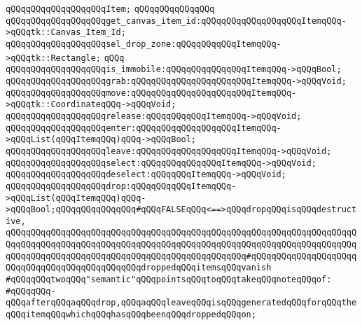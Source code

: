 \verb|qQQqqQQqqQQqqQQqqQQqItem;|\newline
\verb|qQQqqQQqqQQqqQQq|\newline
\verb|qQQqqQQqqQQqqQQqqQQqget_canvas_item_id:qQQqqQQqqQQqqQQqqQQqItemqQQq->qQQqtk::Canvas_Item_Id;|\newline
\newline
\verb|qQQqqQQqqQQqqQQqqQQqsel_drop_zone:qQQqqQQqqQQqItemqQQq->qQQqtk::Rectangle;|\newline
\verb|qQQq|\newline
\verb|qQQqqQQqqQQqqQQqqQQqis_immobile:qQQqqQQqqQQqqQQqItemqQQq->qQQqBool;|\newline
\newline
\verb|qQQqqQQqqQQqqQQqqQQqgrab:qQQqqQQqqQQqqQQqqQQqqQQqItemqQQq->qQQqVoid;|\newline
\verb|qQQqqQQqqQQqqQQqqQQqmove:qQQqqQQqqQQqqQQqqQQqqQQqItemqQQq->qQQqtk::CoordinateqQQq->qQQqVoid;|\newline
\verb|qQQqqQQqqQQqqQQqqQQqrelease:qQQqqQQqqQQqItemqQQq->qQQqVoid;|\newline
\newline
\verb|qQQqqQQqqQQqqQQqqQQqenter:qQQqqQQqqQQqqQQqqQQqItemqQQq->qQQqList(qQQqItemqQQq)qQQq->qQQqBool;|\newline
\verb|qQQqqQQqqQQqqQQqqQQqleave:qQQqqQQqqQQqqQQqqQQqItemqQQq->qQQqVoid;|\newline
\newline
\verb|qQQqqQQqqQQqqQQqqQQqselect:qQQqqQQqqQQqqQQqItemqQQq->qQQqVoid;|\newline
\verb|qQQqqQQqqQQqqQQqqQQqdeselect:qQQqqQQqItemqQQq->qQQqVoid;|\newline
\newline
\verb|qQQqqQQqqQQqqQQqqQQqdrop:qQQqqQQqqQQqItemqQQq->qQQqList(qQQqItemqQQq)qQQq->qQQqBool;qQQqqQQqqQQqqQQq#qQQqFALSEqQQq<==>qQQqdropqQQqisqQQqdestructive,|\newline
\verb|qQQqqQQqqQQqqQQqqQQqqQQqqQQqqQQqqQQqqQQqqQQqqQQqqQQqqQQqqQQqqQQqqQQqqQQqqQQqqQQqqQQqqQQqqQQqqQQqqQQqqQQqqQQqqQQqqQQqqQQqqQQqqQQqqQQqqQQqqQQqqQQqqQQqqQQqqQQqqQQqqQQqqQQqqQQqqQQqqQQqqQQqqQQq#qQQqqQQqqQQqqQQqqQQqqQQqqQQqqQQqqQQqqQQqqQQqqQQqdroppedqQQqitemsqQQqvanish|\newline
\newline
\newline
\newline
\newline
\verb|#qQQqqQQqtwoqQQq"semantic"qQQqpointsqQQqtoqQQqtakeqQQqnoteqQQqof:|\newline
\verb|#qQQqqQQq-qQQqafterqQQqaqQQqdrop,qQQqaqQQqleaveqQQqisqQQqgeneratedqQQqforqQQqtheqQQqitemqQQqwhichqQQqhasqQQqbeenqQQqdroppedqQQqon;|\newline
